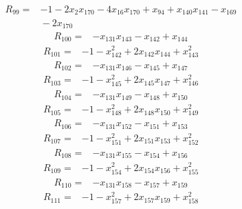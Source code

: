 {\begin{align*}
R_{99} ={}& -1 - 2x_{2} x_{170} - 4x_{16} x_{170} + x_{94} + x_{140} x_{141} - x_{169} \\
&{}  - 2x_{170}
\end{align*}
\begin{align*}
R_{100} ={}& -x_{131} x_{143} - x_{142} + x_{144}
\end{align*}
\begin{align*}
R_{101} ={}& -1 - x_{142}^{2} + 2x_{142} x_{144} + x_{143}^{2}
\end{align*}
\begin{align*}
R_{102} ={}& -x_{131} x_{146} - x_{145} + x_{147}
\end{align*}
\begin{align*}
R_{103} ={}& -1 - x_{145}^{2} + 2x_{145} x_{147} + x_{146}^{2}
\end{align*}
\begin{align*}
R_{104} ={}& -x_{131} x_{149} - x_{148} + x_{150}
\end{align*}
\begin{align*}
R_{105} ={}& -1 - x_{148}^{2} + 2x_{148} x_{150} + x_{149}^{2}
\end{align*}
\begin{align*}
R_{106} ={}& -x_{131} x_{152} - x_{151} + x_{153}
\end{align*}
\begin{align*}
R_{107} ={}& -1 - x_{151}^{2} + 2x_{151} x_{153} + x_{152}^{2}
\end{align*}
\begin{align*}
R_{108} ={}& -x_{131} x_{155} - x_{154} + x_{156}
\end{align*}
\begin{align*}
R_{109} ={}& -1 - x_{154}^{2} + 2x_{154} x_{156} + x_{155}^{2}
\end{align*}
\begin{align*}
R_{110} ={}& -x_{131} x_{158} - x_{157} + x_{159}
\end{align*}
\begin{align*}
R_{111} ={}& -1 - x_{157}^{2} + 2x_{157} x_{159} + x_{158}^{2}
\end{align*}
}
